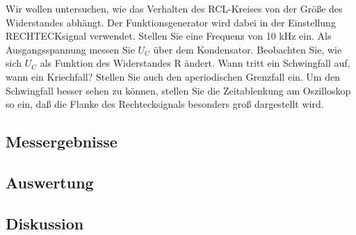 \documentclass[12pt]{scrartcl}
\begin{document}
Wir wollen untersuchen, wie das Verhalten des RCL-Kreises von der Größe des Widerstandes abhängt. Der Funktionsgenerator wird dabei in der Einstellung RECHTECKsignal verwendet. Stellen Sie eine Frequenz von 10 kHz ein. Als Ausgangsspannung messen Sie
$U_C$ über dem Kondensator. Beobachten Sie, wie sich $U_C$
als Funktion des Widerstandes
R ändert. Wann tritt ein Schwingfall auf, wann ein Kriechfall? Stellen Sie auch den
aperiodischen Grenzfall ein. Um den Schwingfall besser sehen zu können, stellen Sie die Zeitablenkung am Oszilloskop so ein, daß die Flanke des Rechtecksignals besonders groß dargestellt wird.
\subsection{Messergebnisse}
\subsection{Auswertung}
\subsection{Diskussion}
\end{document}
